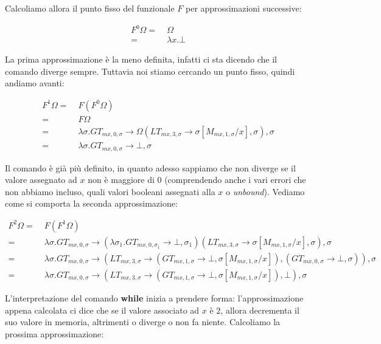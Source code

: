     Calcoliamo allora il punto fisso del funzionale $F$ per approssimazioni successive:
    
    \begin{align*}
        F^0\Omega =\;& \Omega\\
        =\;& \lambda x.\bot
    \end{align*}
    
    La prima approssimazione è la meno definita, infatti ci sta dicendo che il comando diverge sempre. Tuttavia noi stiamo cercando un punto fisso, quindi andiamo avanti:
    
    \begin{align*}
        F^1\Omega =\;& F(F^0\Omega)\\
        =\;& F\Omega\\
        =\;& \lambda\sigma. GT_{mx,0,\sigma} \rightarrow \Omega(LT_{mx,3,\sigma}\rightarrow \sigma[M_{mx,1,\sigma}/x], \sigma), \sigma\\
        =\;& \lambda\sigma. GT_{mx,0,\sigma} \rightarrow \bot, \sigma
    \end{align*}
    
    Il comando è già più definito, in quanto adesso sappiamo che non diverge se il valore assegnato ad $x$ non è maggiore di $0$ (comprendendo anche i vari errori che non abbiamo incluso, quali valori booleani assegnati alla $x$ o \textit{unbound}). Vediamo come si comporta la seconda approssimazione:
    
    \begin{align*}
        F^2\Omega =\;& F(F^1\Omega)\\
        =\;& \lambda\sigma. GT_{mx,0,\sigma} \rightarrow (\lambda\sigma_1. GT_{mx,0,\sigma_1} \rightarrow \bot, \sigma_1)(LT_{mx,3,\sigma}\rightarrow \sigma[M_{mx,1,\sigma}/x], \sigma), \sigma\\
        =\;& \lambda\sigma. GT_{mx,0,\sigma} \rightarrow (LT_{mx,3,\sigma}\rightarrow (GT_{mx,1,\sigma} \rightarrow \bot, \sigma[M_{mx,1,\sigma}/x]), (GT_{mx,0,\sigma} \rightarrow \bot, \sigma)), \sigma\\
        =\;& \lambda\sigma. GT_{mx,0,\sigma} \rightarrow (LT_{mx,3,\sigma}\rightarrow (GT_{mx,1,\sigma} \rightarrow \bot, \sigma[M_{mx,1,\sigma}/x]), \bot), \sigma
    \end{align*}
    
    L'interpretazione del comando \textbf{while} inizia a prendere forma: l'approssimazione appena calcolata ci dice che se il valore associato ad $x$ è $2$, allora decrementa il suo valore in memoria, altrimenti o diverge o non fa niente. Calcoliamo la prossima approssimazione:
    
